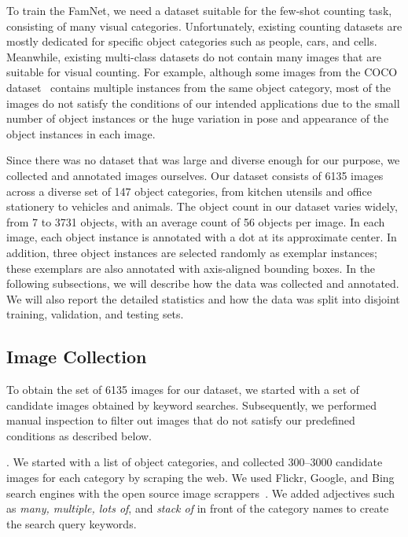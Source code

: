 To train the FamNet, we need a dataset suitable for the few-shot counting task, consisting of many visual categories. Unfortunately, existing counting datasets are mostly dedicated for specific object categories such as people, cars, and cells. Meanwhile, existing multi-class datasets do not contain many images that are suitable for visual counting. For example, although some images from the COCO dataset~\cite{Lin-etal-ECCV14} contains multiple instances from the same object category, most of the images do not satisfy the conditions of our intended applications due to the small number of object instances or the huge variation in pose and appearance of the object instances in each image. 

Since there was no dataset that was large and diverse enough for our purpose, we collected and annotated images ourselves. Our dataset consists of 6135 images across a diverse set of 147 object categories, from kitchen utensils and office stationery to vehicles and animals. The object count in our dataset varies widely, from 7 to 3731 objects, with an average count of 56 objects per image. In each image, each object instance is annotated with a dot at its approximate center. In addition, three object instances are selected randomly as exemplar instances; these exemplars are also annotated with axis-aligned bounding boxes. In the following subsections, we will describe how the data was collected and annotated. We will also report the detailed statistics and how the data was split into disjoint training, validation, and testing sets. 

 

\subsection{Image Collection}

To obtain the set of 6135 images for our dataset, we started with a set of candidate images obtained by keyword searches. Subsequently, we performed manual inspection to filter out images that do not satisfy our predefined conditions as described below. 

. We started with a list of object categories, and collected 300--3000 candidate images for each category by scraping the web. We used Flickr, Google, and Bing search engines with the open source image scrappers~\cite{Flickr-Scrapper,Google-Scrapper}. We added adjectives such as \textit{many, multiple, lots of}, and \textit{stack of} in front of the category names to create the search query keywords. 


